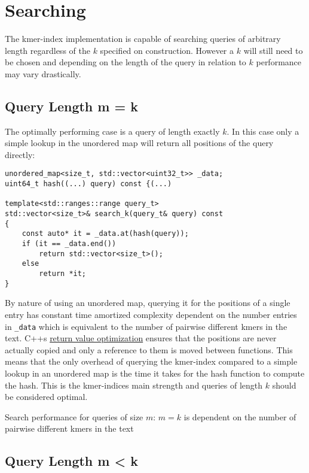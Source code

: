 \section{Searching}

The kmer-index implementation is capable of searching queries of arbitrary length regardless of the $k$ specified on
construction. However a $k$ will still need to be chosen and depending on the length of the query in relation to $k$
performance may vary drastically.

\subsection{Query Length m = k}

The optimally performing case is a query of length exactly $k$. In this case only a simple lookup in the unordered map will
return all positions of the query directly:
\begin{lstlisting}[caption={Search function for queries of size k.},language={[GNU]C++},tabsize=4]
unordered_map<size_t, std::vector<uint32_t>> _data;
uint64_t hash((...) query) const {(...)

template<std::ranges::range query_t>
std::vector<size_t>& search_k(query_t& query) const
{
	const auto* it = _data.at(hash(query));
	if (it == _data.end())
		return std::vector<size_t>();
	else
		return *it;
}
\end{lstlisting}

By nature of using an unordered map, querying it for the positions of a single entry has constant time amortized complexity
dependent on the number entries in \lstinline{_data} which is equivalent to the number of pairwise different kmers in the text. C++s
\href{https://en.cppreference.com/w/cpp/language/copy_elision}{return value optimization} ensures that the positions are
never actually copied and only a reference to them is moved between functions. This means that the only overhead of querying
the kmer-index compared to a simple lookup in an unordered map is the time it takes for the hash function
to compute the hash. This is the kmer-indices main strength and queries of length $k$ should be considered optimal.

\begin{lem}
\label{Lemma 1}
Search performance for queries of size $m:\,m=k$ is dependent on the number of pairwise different kmers in the text
\end{lem}
\newpage
\subsection{Query Length m < k}

